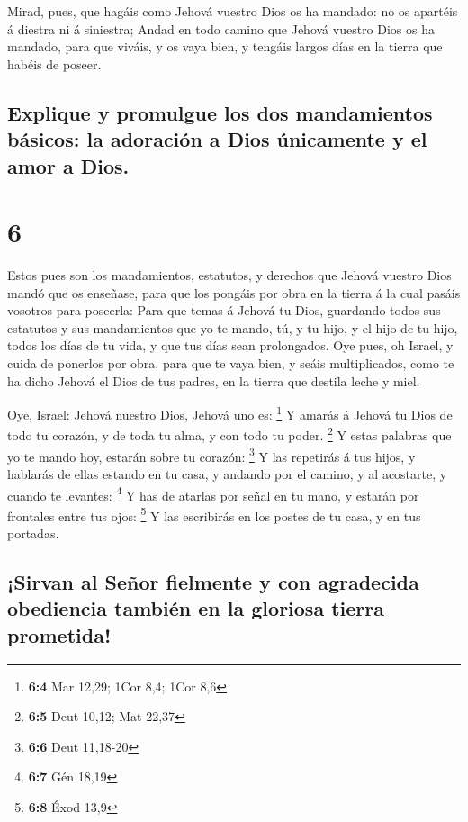  Mirad, pues, que hagáis como Jehová vuestro Dios os ha
mandado: no os apartéis á diestra ni á siniestra;  Andad en
todo camino que Jehová vuestro Dios os ha mandado, para que viváis, y os
vaya bien, y tengáis largos días en la tierra que habéis de poseer.

\hypertarget{explique-y-promulgue-los-dos-mandamientos-buxe1sicos-la-adoraciuxf3n-a-dios-uxfanicamente-y-el-amor-a-dios.}{%
\subsection{Explique y promulgue los dos mandamientos básicos: la
adoración a Dios únicamente y el amor a
Dios.}\label{explique-y-promulgue-los-dos-mandamientos-buxe1sicos-la-adoraciuxf3n-a-dios-uxfanicamente-y-el-amor-a-dios.}}

\hypertarget{section-5}{%
\section{6}\label{section-5}}

 Estos pues son los mandamientos, estatutos, y derechos que
Jehová vuestro Dios mandó que os enseñase, para que los pongáis por obra
en la tierra á la cual pasáis vosotros para poseerla:  Para
que temas á Jehová tu Dios, guardando todos sus estatutos y sus
mandamientos que yo te mando, tú, y tu hijo, y el hijo de tu hijo, todos
los días de tu vida, y que tus días sean prolongados.  Oye
pues, oh Israel, y cuida de ponerlos por obra, para que te vaya bien, y
seáis multiplicados, como te ha dicho Jehová el Dios de tus padres, en
la tierra que destila leche y miel.

 Oye, Israel: Jehová nuestro Dios, Jehová uno es:
\footnote{\textbf{6:4} Mar 12,29; 1Cor 8,4; 1Cor 8,6}  Y
amarás á Jehová tu Dios de todo tu corazón, y de toda tu alma, y con
todo tu poder. \footnote{\textbf{6:5} Deut 10,12; Mat 22,37}
 Y estas palabras que yo te mando hoy, estarán sobre tu
corazón: \footnote{\textbf{6:6} Deut 11,18-20}  Y las
repetirás á tus hijos, y hablarás de ellas estando en tu casa, y andando
por el camino, y al acostarte, y cuando te levantes: \footnote{\textbf{6:7}
  Gén 18,19}  Y has de atarlas por señal en tu mano, y
estarán por frontales entre tus ojos: \footnote{\textbf{6:8} Éxod 13,9}
 Y las escribirás en los postes de tu casa, y en tus
portadas.

\hypertarget{sirvan-al-seuxf1or-fielmente-y-con-agradecida-obediencia-tambiuxe9n-en-la-gloriosa-tierra-prometida}{%
\subsection{¡Sirvan al Señor fielmente y con agradecida obediencia
también en la gloriosa tierra
prometida!}\label{sirvan-al-seuxf1or-fielmente-y-con-agradecida-obediencia-tambiuxe9n-en-la-gloriosa-tierra-prometida}}

